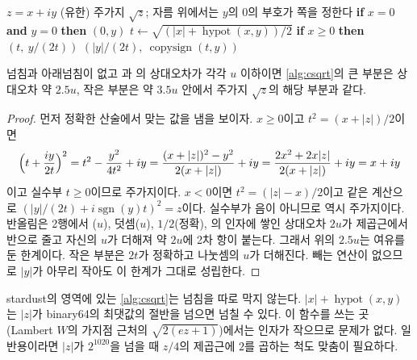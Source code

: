 \begin{algorithm}[htbp]
\begin{algorithmic}[1]
\Require $z=x+iy$ (유한)
\Ensure 주가지 $\sqrt z$; 자름 위에서는 $y$의 $0$의 부호가 쪽을 정한다
\State \textbf{if} $x=0$ \textbf{and} $y=0$ \textbf{then} \Return $(0,y)$ 
\State $t\gets\sqrt{(|x|+\operatorname{hypot}(x,y))/2}$ 
\State \textbf{if} $x\ge0$ \textbf{then} \Return $(t,\ y/(2t))$
\State \Return $(|y|/(2t),\ \operatorname{copysign}(t,y))$
\end{algorithmic}
\caption{주가지 제곱근 (Kahan; stardust 의 )}
\label{alg:csqrt}
\end{algorithm}

\begin{proposition}
\label{prop:csqrt}
넘침과 아래넘침이 없고 과 의 상대오차가 각각 $u$ 이하이면 \cref{alg:csqrt}의 큰 부분은 상대오차 약 $2.5u$, 작은 부분은 약 $3.5u$ 안에서 주가지 $\sqrt z$의 해당 부분과 같다.
\end{proposition}

\begin{proof}
먼저 정확한 산술에서 맞는 값을 냄을 보이자. $x\ge0$이고 $t^2=(x+|z|)/2$이면
\[
\Bigl(t+\frac{iy}{2t}\Bigr)^2=t^2-\frac{y^2}{4t^2}+iy=\frac{(x+|z|)^2-y^2}{2(x+|z|)}+iy=\frac{2x^2+2x|z|}{2(x+|z|)}+iy=x+iy
\]
이고 실수부 $t\ge0$이므로 주가지이다. $x<0$이면 $t^2=(|z|-x)/2$이고 같은 계산으로 $(|y|/(2t)+i\operatorname{sgn}(y)t)^2=z$이다. 실수부가 음이 아니므로 역시 주가지이다. 반올림은 2행에서 ($u$), 덧셈($u$), $1/2$(정확), 의 인자에 쌓인 상대오차 $2u$가 제곱근에서 반으로 줄고  자신의 $u$가 더해져 약 $2u$에 2차 항이 붙는다. 그래서 위의 $2.5u$는 여유를 둔 한계이다. 작은 부분은 $2t$가 정확하고 나눗셈의 $u$가 더해진다. 빼는 연산이 없으므로 $|y|$가 아무리 작아도 이 한계가 그대로 성립한다.
\end{proof}

stardust의  영역에 있는 \cref{alg:csqrt}는 넘침을 따로 막지 않는다. $|x|+\operatorname{hypot}(x,y)$는 $|z|$가 binary64의 최댓값의 절반을 넘으면 넘칠 수 있다. 이 함수를 쓰는 곳(Lambert $W$의 가지점 근처의 $\sqrt{2(ez+1)}$)에서는 인자가 작으므로 문제가 없다. 일반용이라면 $|z|$가 $2^{1020}$을 넘을 때 $z/4$의 제곱근에 $2$를 곱하는 척도 맞춤이 필요하다.

